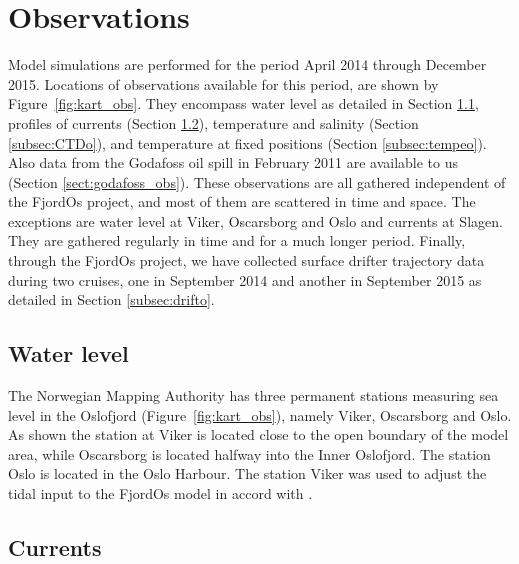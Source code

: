 \clearpage
\section{Observations}
\label{sec:obser}

Model simulations are performed for the period April 2014 through December 2015. Locations of observations available for this period, are shown by Figure~\ref{fig:kart_obs}. They encompass water level as detailed in Section \ref{subsec:wlevelo}, profiles of currents (Section \ref{subsec:curreo}), temperature and salinity (Section \ref{subsec:CTDo}), and temperature at fixed positions (Section \ref{subsec:tempeo}). Also data from the Godafoss oil spill in February 2011 are available to us (Section \ref{sect:godafoss_obs}). These observations are all gathered independent of the FjordOs project, and most of them are scattered in time and space. The exceptions are water level at Viker, Oscarsborg and Oslo and currents at Slagen. They are gathered regularly in time and for a much longer period. Finally, through the FjordOs project, we have collected surface drifter trajectory data during two cruises, one in September 2014 and another in September 2015 as detailed in Section \ref{subsec:drifto}.


\subsection{Water level}
\label{subsec:wlevelo}
The Norwegian Mapping Authority has three permanent stations measuring sea level in the Oslofjord (Figure~\ref{fig:kart_obs}), namely Viker, Oscarsborg and Oslo. As shown the station at Viker is located close to the open boundary of the model area, while Oscarsborg is located halfway into the Inner Oslofjord. The station Oslo is located in the Oslo Harbour. The station Viker was used to adjust the tidal input to the FjordOs model in accord with \cite{hjelm:etal:2017}.

\subsection{Currents}
\label{subsec:curreo}
